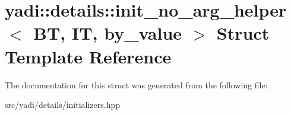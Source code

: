 \hypertarget{structyadi_1_1details_1_1init__no__arg__helper}{}\section{yadi\+:\+:details\+:\+:init\+\_\+no\+\_\+arg\+\_\+helper$<$ BT, IT, by\+\_\+value $>$ Struct Template Reference}
\label{structyadi_1_1details_1_1init__no__arg__helper}


The documentation for this struct was generated from the following file\+:\begin{DoxyCompactItemize}
\item 
src/yadi/details/initializers.\+hpp\end{DoxyCompactItemize}
